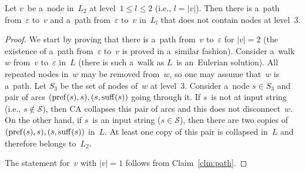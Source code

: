 \begin{lemma}\label{lemma:toepsilon}
Let $v$~be a~node in~$L_2$ at level~$1 \le l \le 2$ (i.e., $l=|v|$). Then there is a~path from~$\varepsilon$ to~$v$ and a~path from~$\varepsilon$ to~$v$ in~$L_l$ that does not contain nodes at level~3.
\end{lemma}
\begin{proof}
We start by proving that there is a~path from~$v$ to~$\varepsilon$ 
for $|v|=2$ (the existence of a~path from~$\varepsilon$ to~$v$ is proved in a~similar fashion).
Consider a~walk~$w$ from~$v$ to~$\varepsilon$ in~$L$ (there is such a~walk as $L$~is an~Eulerian solution). All repeated nodes in~$w$ may be removed from~$w$, so one may assume that~$w$ is a~path. Let $S_3$ be the set of nodes of~$w$ at level~3. Consider a~node $s \in S_3$ and pair of arcs  $(\operatorname{pref}(s), s), (s, \operatorname{suff}(s))$ going through it. If $s$~is not at input string (i.e., $s \not \in \mathcal{S}$), then CA collapses this pair of arcs and this does not disconnect~$w$. On the other hand, if $s$~is an input string ($s \in \mathcal{S}$), then there are two copies of $(\operatorname{pref}(s), s), (s, \operatorname{suff}(s))$ in~$L$. At least one copy of this pair is collapsed in~$L$ and therefore belongs to~$L_2$.

The statement for~$v$ with $|v|=1$ follows from Claim~\ref{clm:path}.
\end{proof}


